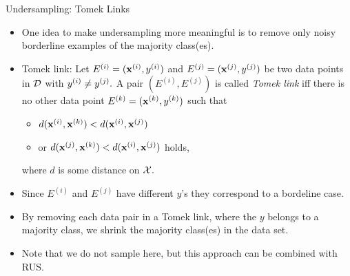 \documentclass[11pt,compress,t,notes=noshow, xcolor=table]{beamer}
\begin{document}
	\begin{frame}{Undersampling: Tomek Links}
		
		\footnotesize{
			\begin{itemize}
				\item One idea to make undersampling more meaningful is to remove only noisy borderline examples of the majority class(es).
				\item Tomek link: Let $E^{(i)} = (\mathbf{x}^{(i)},y^{(i)})$ and $E^{(j)} = (\mathbf{x}^{(j)},y^{(j)})$ be two data points in $\mathcal{D}$ with $y^{(i)}\neq y^{(j)}.$ A pair $(E^{(i)},E^{(j)})$ is called \emph{Tomek link} iff there is no other data point $E^{(k)} = (\mathbf{x}^{(k)},y^{(k)})$ such that
%				
				\begin{itemize} \footnotesize
%					
					\item [] $d(\mathbf{x}^{(i)}, \mathbf{x}^{(k)}) < d(\mathbf{x}^{(i)}, \mathbf{x}^{(j)}) $
					\item [] or $d(\mathbf{x}^{(j)}, \mathbf{x}^{(k)}) < d(\mathbf{x}^{(i)}, \mathbf{x}^{(j)}) $ holds,
%					
				\end{itemize}
%			
				where $d$ is some distance on $\mathcal{X}.$
					
			\end{itemize}
%						
			\begin{minipage}{0.55\textwidth}	
%				
			\begin{itemize} \footnotesize
				\item Since $E^{(i)}$ and $E^{(j)}$ have different $y$'s they correspond to a bordeline case.
				\item By removing each data pair in a Tomek link, where the $y$ belongs to a majority class, we shrink the majority class(es) in the data set. 
%				
				\item Note that we do not sample here, but this approach can be combined with RUS. 	
					

\end{itemize}
\end{minipage}}
\end{frame}
\end{document}
